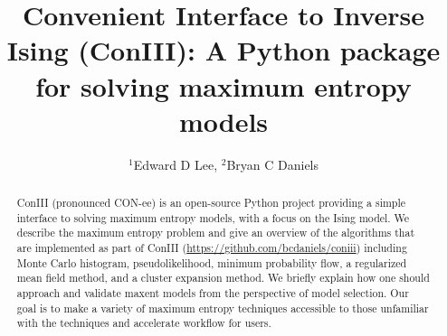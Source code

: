\documentclass[aps,prl,twocolumn,nofootinbib]{revtex4-1}
\begin{document}
\newcommand{\mr}[1]{\mathrm{#1}}
\newcommand{\mb}[1]{\mathbf{#1}}
\newcommand{\br}[1]{\left<#1\right>}
\newcommand{\bl}[1]{\left|#1\right|}
\newcommand{\mc}[1]{\mathcal{#1}}
\newcommand{\tb}[1]{\textcolor{blue}{#1}}
\newcommand{\tr}[1]{\textcolor{red}{#1}}
\newcommand{\tg}[1]{\textcolor{green}{#1}}
\newcommand{\si}[0]{{\rm s}_{\rm i}}
\newcommand{\sj}[0]{{\rm s}_{\rm j}}
\newcommand{\bs}[1]{\boldsymbol{#1}}
\newcommand{\rs}[0]{{\rm s}}
\newcommand{\rk}[0]{{\rm k}}

\title{Convenient Interface to Inverse Ising (ConIII): A Python package for solving maximum entropy models}
\author{$^1$Edward D Lee, $^2$Bryan C Daniels}

\begin{abstract}
ConIII (pronounced CON-ee) is an open-source Python project providing a simple interface to solving maximum entropy models, with a focus on the Ising model. We describe the maximum entropy problem and give an overview of the algorithms that are implemented as part of ConIII (\url{https://github.com/bcdaniels/coniii}) including Monte Carlo histogram, pseudolikelihood,  minimum probability flow, a regularized mean field method, and a cluster expansion method. We briefly explain how one should approach and validate maxent models from the perspective of model selection. Our goal is to make a variety of maximum entropy techniques accessible to those unfamiliar with the techniques and accelerate workflow for users.
\end{abstract}

\maketitle
\end{document}
